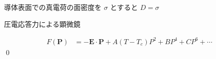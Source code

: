\documentclass[uplatex,dvipdfmx,a4paper,11pt]{jlreq}
\makeatletter
\newcommand{\EE}{\bm{E}}
\newcommand{\PP}{\bm{P}}
\numberwithin{equation}{section}
\theoremstyle{definition}
\renewenvironment{proof}[1][\proofname]{\par
  \normalfont
  \topsep6\p@\@plus6\p@ \trivlist
  \item[\hskip\labelsep{\bfseries #1}\@addpunct{\bfseries}]\ignorespaces\quad\par
}{%
  \qed\endtrivlist\@endpefalse
}
\renewcommand\proofname{証明}
\makeatother
\begin{document}
\begin{proposition}[導体と誘電体の境界]
  導体表面での真電荷の面密度を $\sigma$ とすると
  $D = \sigma$
\end{proposition}

\begin{proposition}[誘電体境界と鏡像法]
\end{proposition}

\begin{proposition}[真電荷の周囲を誘電体で囲む]
\end{proposition}

\begin{proposition}[コンデンサーの極板]
\end{proposition}

圧電応答力による顕微鏡
\begin{definition}[強誘電体]

\end{definition}
\begin{proof}
  \begin{align}
    F(\PP) & = - \EE\cdot\PP + A(T - T_c)P^2 + BP^4 + CP^6 + \cdots
  \end{align}
\end{proof}
\end{document}
